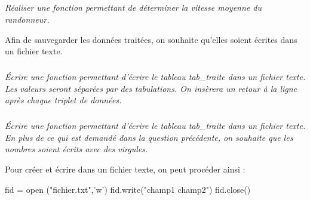 \documentclass[10pt,oneside]{article}
\begin{document}
\subparagraph{}
\textit{Réaliser une fonction permettant de déterminer la vitesse moyenne du randonneur.}

Afin de sauvegarder les données traitées, on souhaite qu'elles soient écrites dans un fichier texte.

\subparagraph{}
\textit{Écrire une fonction permettant d'écrire le tableau \textsf{tab\_traite} dans un fichier texte. Les valeurs seront séparées par des tabulations. On insèrera un retour à la ligne après chaque triplet de données.}


\subparagraph{}
\textit{Écrire une fonction permettant d'écrire le tableau \textsf{tab\_traite} dans un fichier texte. En plus de ce qui est demandé dans la question précédente, on souhaite que les nombres soient écrits avec des virgules.}

\begin{py}

Pour créer et écrire dans un fichier texte, on peut procéder ainsi :

\begin{python}
fid = open ("fichier.txt",'w')
fid.write("champ1 \tab champ2")
fid.close()
\end{python}

\end{py}
\end{document}
